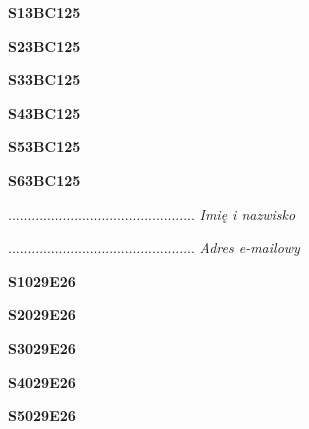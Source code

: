 \begin{turn}{90}\huge \textbf{S13BC125}\end{turn}

\begin{turn}{90}\huge \textbf{S23BC125}\end{turn}

\begin{turn}{90}\huge \textbf{S33BC125}\end{turn}

\begin{turn}{90}\huge \textbf{S43BC125}\end{turn}

\begin{turn}{90}\huge \textbf{S53BC125}\end{turn}

\begin{turn}{90}\huge \textbf{S63BC125}\end{turn}

\begin{turn}{90}\begin{minipage}{\linewidth} \vspace{20mm} ................................................  \textit{Imię i nazwisko}\end{minipage}\end{turn}

\begin{turn}{90}\begin{minipage}{\linewidth} \vspace{20mm} ................................................  \textit{Adres e-mailowy}\end{minipage}\end{turn}

\begin{turn}{90}\huge \textbf{S1029E26}\end{turn}

\begin{turn}{90}\huge \textbf{S2029E26}\end{turn}

\begin{turn}{90}\huge \textbf{S3029E26}\end{turn}

\begin{turn}{90}\huge \textbf{S4029E26}\end{turn}

\begin{turn}{90}\huge \textbf{S5029E26}\end{turn}

